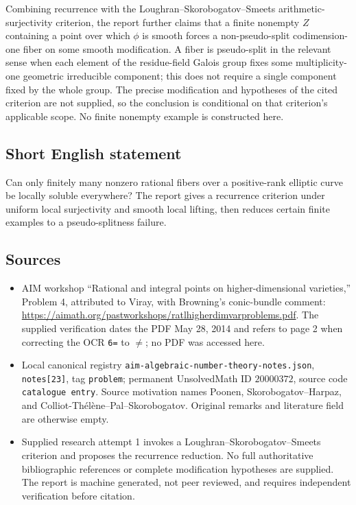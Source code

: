\documentclass[11pt]{article}
\begin{document}
Combining recurrence with the Loughran--Skorobogatov--Smeets arithmetic-surjectivity criterion, the report further claims that a finite nonempty \(Z\) containing a point over which \(\phi\) is smooth forces a non-pseudo-split codimension-one fiber on some smooth modification. A fiber is pseudo-split in the relevant sense when each element of the residue-field Galois group fixes some multiplicity-one geometric irreducible component; this does not require a single component fixed by the whole group. The precise modification and hypotheses of the cited criterion are not supplied, so the conclusion is conditional on that criterion's applicable scope. No finite nonempty example is constructed here.
\subsection{Short English statement}
Can only finitely many nonzero rational fibers over a positive-rank elliptic curve be locally soluble everywhere? The report gives a recurrence criterion under uniform local surjectivity and smooth local lifting, then reduces certain finite examples to a pseudo-splitness failure.
\subsection{Sources}
\begin{itemize}
\item AIM workshop ``Rational and integral points on higher-dimensional varieties,'' Problem 4, attributed to Viray, with Browning's conic-bundle comment: \url{https://aimath.org/pastworkshops/ratlhigherdimvarproblems.pdf}. The supplied verification dates the PDF May 28, 2014 and refers to page 2 when correcting the OCR \texttt{6=} to \(\ne\); no PDF was accessed here.
\item Local canonical registry \texttt{aim-algebraic-number-theory-notes.json}, \texttt{notes[23]}, tag \texttt{problem}; permanent UnsolvedMath ID \(20000372\), source code \texttt{catalogue entry}. Source motivation names Poonen, Skorobogatov--Harpaz, and Colliot-Th\'el\`ene--Pal--Skorobogatov. Original remarks and literature field are otherwise empty.
\item Supplied research attempt 1 invokes a Loughran--Skorobogatov--Smeets criterion and proposes the recurrence reduction. No full authoritative bibliographic references or complete modification hypotheses are supplied. The report is machine generated, not peer reviewed, and requires independent verification before citation.
\end{itemize}
\end{document}
